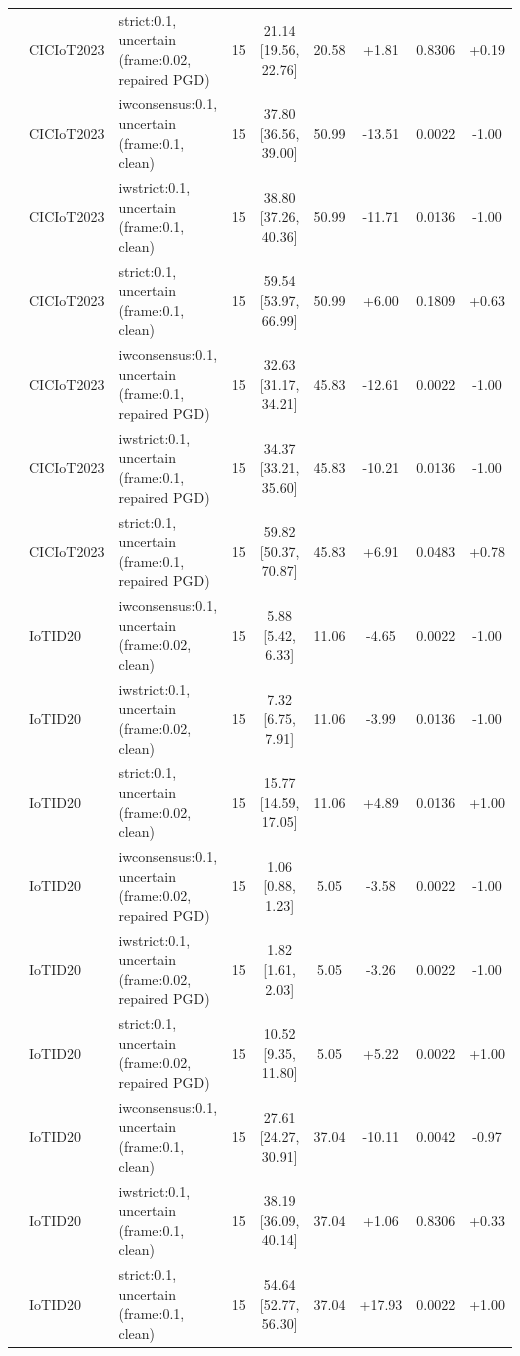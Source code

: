 \begin{table}[t]
\begin{tabular}{lllcccccc}
 & CICIoT2023 & strict:0.1, uncertain (frame:0.02, repaired PGD) & 15 & 21.14 [19.56, 22.76] & 20.58 & +1.81 & 0.8306 & +0.19 \\
 & CICIoT2023 & iwconsensus:0.1, uncertain (frame:0.1, clean) & 15 & 37.80 [36.56, 39.00] & 50.99 & -13.51 & 0.0022 & -1.00 \\
 & CICIoT2023 & iwstrict:0.1, uncertain (frame:0.1, clean) & 15 & 38.80 [37.26, 40.36] & 50.99 & -11.71 & 0.0136 & -1.00 \\
 & CICIoT2023 & strict:0.1, uncertain (frame:0.1, clean) & 15 & 59.54 [53.97, 66.99] & 50.99 & +6.00 & 0.1809 & +0.63 \\
 & CICIoT2023 & iwconsensus:0.1, uncertain (frame:0.1, repaired PGD) & 15 & 32.63 [31.17, 34.21] & 45.83 & -12.61 & 0.0022 & -1.00 \\
 & CICIoT2023 & iwstrict:0.1, uncertain (frame:0.1, repaired PGD) & 15 & 34.37 [33.21, 35.60] & 45.83 & -10.21 & 0.0136 & -1.00 \\
 & CICIoT2023 & strict:0.1, uncertain (frame:0.1, repaired PGD) & 15 & 59.82 [50.37, 70.87] & 45.83 & +6.91 & 0.0483 & +0.78 \\
 & IoTID20 & iwconsensus:0.1, uncertain (frame:0.02, clean) & 15 & 5.88 [5.42, 6.33] & 11.06 & -4.65 & 0.0022 & -1.00 \\
 & IoTID20 & iwstrict:0.1, uncertain (frame:0.02, clean) & 15 & 7.32 [6.75, 7.91] & 11.06 & -3.99 & 0.0136 & -1.00 \\
 & IoTID20 & strict:0.1, uncertain (frame:0.02, clean) & 15 & 15.77 [14.59, 17.05] & 11.06 & +4.89 & 0.0136 & +1.00 \\
 & IoTID20 & iwconsensus:0.1, uncertain (frame:0.02, repaired PGD) & 15 & 1.06 [0.88, 1.23] & 5.05 & -3.58 & 0.0022 & -1.00 \\
 & IoTID20 & iwstrict:0.1, uncertain (frame:0.02, repaired PGD) & 15 & 1.82 [1.61, 2.03] & 5.05 & -3.26 & 0.0022 & -1.00 \\
 & IoTID20 & strict:0.1, uncertain (frame:0.02, repaired PGD) & 15 & 10.52 [9.35, 11.80] & 5.05 & +5.22 & 0.0022 & +1.00 \\
 & IoTID20 & iwconsensus:0.1, uncertain (frame:0.1, clean) & 15 & 27.61 [24.27, 30.91] & 37.04 & -10.11 & 0.0042 & -0.97 \\
 & IoTID20 & iwstrict:0.1, uncertain (frame:0.1, clean) & 15 & 38.19 [36.09, 40.14] & 37.04 & +1.06 & 0.8306 & +0.33 \\
 & IoTID20 & strict:0.1, uncertain (frame:0.1, clean) & 15 & 54.64 [52.77, 56.30] & 37.04 & +17.93 & 0.0022 & +1.00 \\

\end{tabular}
\end{table}
